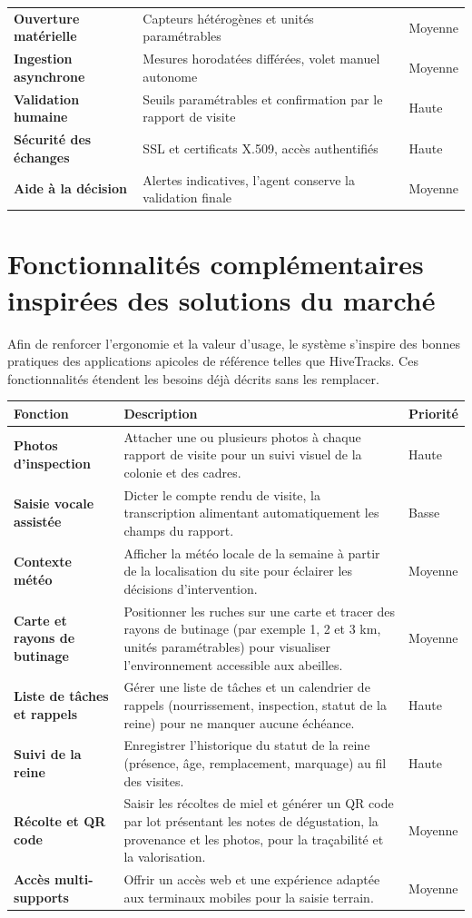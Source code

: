 \begin{longtable}{>{\bfseries}p{3.4cm} p{7.6cm} C{2.2cm}}
Ouverture matérielle & Capteurs hétérogènes et unités paramétrables & Moyenne \\
Ingestion asynchrone & Mesures horodatées différées, volet manuel autonome & Moyenne \\
Validation humaine & Seuils paramétrables et confirmation par le rapport de visite & Haute \\
Sécurité des échanges & SSL et certificats X.509, accès authentifiés & Haute \\
Aide à la décision & Alertes indicatives, l'agent conserve la validation finale & Moyenne \\
\bottomrule
\end{longtable}

\section{Fonctionnalités complémentaires inspirées des solutions du marché}
Afin de renforcer l'ergonomie et la valeur d'usage, le système s'inspire des
bonnes pratiques des applications apicoles de référence telles que HiveTracks.
Ces fonctionnalités étendent les besoins déjà décrits sans les remplacer.
\begin{longtable}{>{\bfseries}p{4.2cm} p{7.5cm} C{2.1cm}}
\toprule
\textbf{Fonction} & \textbf{Description} & \textbf{Priorité} \\
\midrule
\endhead
Photos d'inspection & Attacher une ou plusieurs photos à chaque rapport de visite pour un suivi visuel de la colonie et des cadres. & Haute \\
Saisie vocale assistée & Dicter le compte rendu de visite, la transcription alimentant automatiquement les champs du rapport. & Basse \\
Contexte météo & Afficher la météo locale de la semaine à partir de la localisation du site pour éclairer les décisions d'intervention. & Moyenne \\
Carte et rayons de butinage & Positionner les ruches sur une carte et tracer des rayons de butinage (par exemple 1, 2 et 3 km, unités paramétrables) pour visualiser l'environnement accessible aux abeilles. & Moyenne \\
Liste de tâches et rappels & Gérer une liste de tâches et un calendrier de rappels (nourrissement, inspection, statut de la reine) pour ne manquer aucune échéance. & Haute \\
Suivi de la reine & Enregistrer l'historique du statut de la reine (présence, âge, remplacement, marquage) au fil des visites. & Haute \\
Récolte et QR code & Saisir les récoltes de miel et générer un QR code par lot présentant les notes de dégustation, la provenance et les photos, pour la traçabilité et la valorisation. & Moyenne \\
Accès multi-supports & Offrir un accès web et une expérience adaptée aux terminaux mobiles pour la saisie terrain. & Moyenne \\
\bottomrule
\end{longtable}

